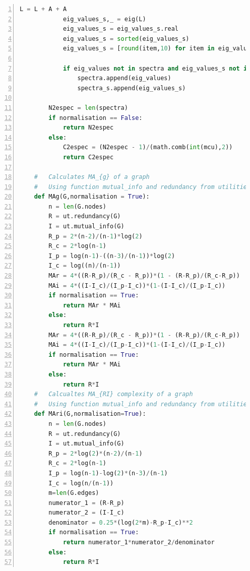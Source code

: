 \documentclass[12pt]{article}
\begin{document}
\begin{lstlisting}[numbers=left,language=Python,breaklines=true]
            L = L + A + A
            eig_values_s,_ = eig(L)
            eig_values_s = eig_values_s.real
            eig_values_s = sorted(eig_values_s)
            eig_values_s = [round(item,10) for item in eig_values_s]
            
            if eig_values not in spectra and eig_values_s not in spectra_s:
                spectra.append(eig_values)
                spectra_s.append(eig_values_s)
                
        N2espec = len(spectra)
        if normalisation == False:
            return N2espec
        else:
            C2espec = (N2espec - 1)/(math.comb(int(mcu),2))
            return C2espec
    
    #   Calculates MA_{g} of a graph
    #   Using function mutual_info and redundancy from utilities to calcualte I and R
    def MAg(G,normalisation = True):
        n = len(G.nodes)
        R = ut.redundancy(G)
        I = ut.mutual_info(G)
        R_p = 2*(n-2)/(n-1)*log(2)
        R_c = 2*log(n-1)
        I_p = log(n-1)-((n-3)/(n-1))*log(2)
        I_c = log((n)/(n-1))
        MAr = 4*((R-R_p)/(R_c - R_p))*(1 - (R-R_p)/(R_c-R_p))
        MAi = 4*((I-I_c)/(I_p-I_c))*(1-(I-I_c)/(I_p-I_c))
        if normalisation == True:
            return MAr * MAi
        else:
            return R*I
        MAr = 4*((R-R_p)/(R_c - R_p))*(1 - (R-R_p)/(R_c-R_p))
        MAi = 4*((I-I_c)/(I_p-I_c))*(1-(I-I_c)/(I_p-I_c))
        if normalisation == True:
            return MAr * MAi
        else:
            return R*I
    #   Calcualtes MA_{RI} complexity of a graph
    #   Using function mutual_info and redundancy from utilities to calcualte I and R
    def MAri(G,normalisation=True):
        n = len(G.nodes)
        R = ut.redundancy(G)
        I = ut.mutual_info(G)
        R_p = 2*log(2)*(n-2)/(n-1)
        R_c = 2*log(n-1)
        I_p = log(n-1)-log(2)*(n-3)/(n-1)
        I_c = log(n/(n-1))
        m=len(G.edges)
        numerator_1 = (R-R_p)
        numerator_2 = (I-I_c)
        denominator = 0.25*(log(2*m)-R_p-I_c)**2
        if normalisation == True:
            return numerator_1*numerator_2/denominator
        else:
            return R*I    
\end{lstlisting}

\printbibliography
\end{document}
